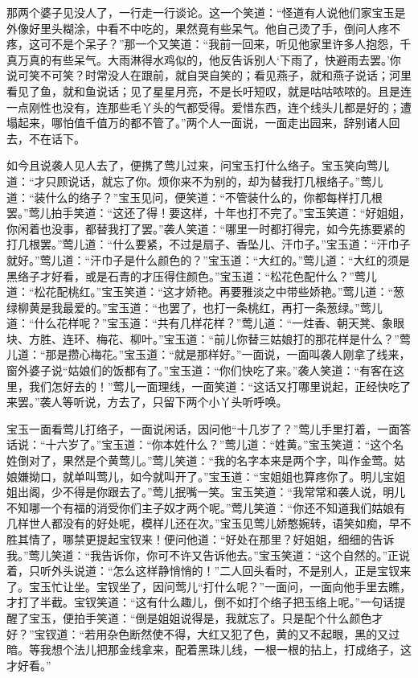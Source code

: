 \documentclass[12pt,oneside]{book}
\begin{document}
那两个婆子见没人了，一行走一行谈论。这一个笑道：“怪道有人说他们家宝玉是外像好里头糊涂，中看不中吃的，果然竟有些呆气。他自己烫了手，倒问人疼不疼，这可不是个呆子？”那一个又笑道：“我前一回来，听见他家里许多人抱怨，千真万真的有些呆气。大雨淋得水鸡似的，他反告诉别人‘下雨了，快避雨去罢。’你说可笑不可笑？时常没人在跟前，就自哭自笑的；看见燕子，就和燕子说话；河里看见了鱼，就和鱼说话；见了星星月亮，不是长吁短叹，就是咕咕哝哝的。且是连一点刚性也没有，连那些毛丫头的气都受得。爱惜东西，连个线头儿都是好的；遭塌起来，哪怕值千值万的都不管了。”两个人一面说，一面走出园来，辞别诸人回去，不在话下。

如今且说袭人见人去了，便携了莺儿过来，问宝玉打什么络子。宝玉笑向莺儿道：“才只顾说话，就忘了你。烦你来不为别的，却为替我打几根络子。”莺儿道：“装什么的络子？”宝玉见问，便笑道：“不管装什么的，你都每样打几根罢。”莺儿拍手笑道：“这还了得！要这样，十年也打不完了。”宝玉笑道：“好姐姐，你闲着也没事，都替我打了罢。”袭人笑道：“哪里一时都打得完，如今先拣要紧的打几根罢。”莺儿道：“什么要紧，不过是扇子、香坠儿、汗巾子。”宝玉道：“汗巾子就好。”莺儿道：“汗巾子是什么颜色的？”宝玉道：“大红的。”莺儿道：“大红的须是黑络子才好看，或是石青的才压得住颜色。”宝玉道：“松花色配什么？”莺儿道：“松花配桃红。”宝玉笑道：“这才娇艳。再要雅淡之中带些娇艳。”莺儿道：“葱绿柳黄是我最爱的。”宝玉道：“也罢了，也打一条桃红，再打一条葱绿。”莺儿道：“什么花样呢？”宝玉道：“共有几样花样？”莺儿道：“一炷香、朝天凳、象眼块、方胜、连环、梅花、柳叶。”宝玉道：“前儿你替三姑娘打的那花样是什么？”莺儿道：“那是攒心梅花。”宝玉道：“就是那样好。”一面说，一面叫袭人刚拿了线来，窗外婆子说“姑娘们的饭都有了。”宝玉道：“你们快吃了来。”袭人笑道：“有客在这里，我们怎好去的！”莺儿一面理线，一面笑道：“这话又打哪里说起，正经快吃了来罢。”袭人等听说，方去了，只留下两个小丫头听呼唤。

宝玉一面看莺儿打络子，一面说闲话，因问他“十几岁了？”莺儿手里打着，一面答话说：“十六岁了。”宝玉道：“你本姓什么？”莺儿道：“姓黄。”宝玉笑道：“这个名姓倒对了，果然是个黄莺儿。”莺儿笑道：“我的名字本来是两个字，叫作金莺。姑娘嫌拗口，就单叫莺儿，如今就叫开了。”宝玉道：“宝姐姐也算疼你了。明儿宝姐姐出阁，少不得是你跟去了。”莺儿抿嘴一笑。宝玉笑道：“我常常和袭人说，明儿不知哪一个有福的消受你们主子奴才两个呢。”莺儿笑道：“你还不知道我们姑娘有几样世人都没有的好处呢，模样儿还在次。”宝玉见莺儿娇憨婉转，语笑如痴，早不胜其情了，哪禁更提起宝钗来！便问他道：“好处在那里？好姐姐，细细的告诉我。”莺儿笑道：“我告诉你，你可不许又告诉他去。”宝玉笑道：“这个自然的。”正说着，只听外头说道：“怎么这样静悄悄的！”二人回头看时，不是别人，正是宝钗来了。宝玉忙让坐。宝钗坐了，因问莺儿“打什么呢？”一面问，一面向他手里去瞧，才打了半截。宝钗笑道：“这有什么趣儿，倒不如打个络子把玉络上呢。”一句话提醒了宝玉，便拍手笑道：“倒是姐姐说得是，我就忘了。只是配个什么颜色才好？”宝钗道：“若用杂色断然使不得，大红又犯了色，黄的又不起眼，黑的又过暗。等我想个法儿把那金线拿来，配着黑珠儿线，一根一根的拈上，打成络子，这才好看。”
\end{document}
